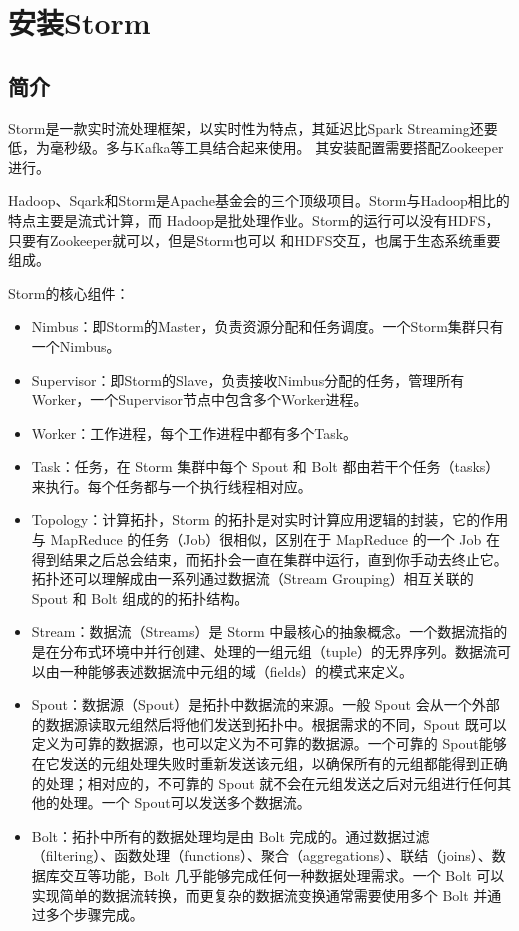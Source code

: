 \section{安装Storm}
\subsection{简介}
Storm是一款实时流处理框架，以实时性为特点，其延迟比Spark Streaming还要低，为毫秒级。多与Kafka等工具结合起来使用。
其安装配置需要搭配Zookeeper进行。

Hadoop、Sqark和Storm是Apache基金会的三个顶级项目。Storm与Hadoop相比的特点主要是流式计算，而
Hadoop是批处理作业。Storm的运行可以没有HDFS，只要有Zookeeper就可以，但是Storm也可以
和HDFS交互，也属于生态系统重要组成。

Storm的核心组件：

\begin{itemize}
	\item Nimbus：即Storm的Master，负责资源分配和任务调度。一个Storm集群只有一个Nimbus。
	\item Supervisor：即Storm的Slave，负责接收Nimbus分配的任务，管理所有Worker，一个Supervisor节点中包含多个Worker进程。
	\item Worker：工作进程，每个工作进程中都有多个Task。
	\item Task：任务，在 Storm 集群中每个 Spout 和 Bolt 都由若干个任务（tasks）来执行。每个任务都与一个执行线程相对应。
	\item Topology：计算拓扑，Storm 的拓扑是对实时计算应用逻辑的封装，它的作用与 MapReduce 的任务（Job）很相似，区别在于 MapReduce 的一个 Job 在得到结果之后总会结束，而拓扑会一直在集群中运行，直到你手动去终止它。拓扑还可以理解成由一系列通过数据流（Stream Grouping）相互关联的 Spout 和 Bolt 组成的的拓扑结构。
	\item Stream：数据流（Streams）是 Storm 中最核心的抽象概念。一个数据流指的是在分布式环境中并行创建、处理的一组元组（tuple）的无界序列。数据流可以由一种能够表述数据流中元组的域（fields）的模式来定义。
	\item Spout：数据源（Spout）是拓扑中数据流的来源。一般 Spout 会从一个外部的数据源读取元组然后将他们发送到拓扑中。根据需求的不同，Spout 既可以定义为可靠的数据源，也可以定义为不可靠的数据源。一个可靠的 Spout能够在它发送的元组处理失败时重新发送该元组，以确保所有的元组都能得到正确的处理；相对应的，不可靠的 Spout 就不会在元组发送之后对元组进行任何其他的处理。一个 Spout可以发送多个数据流。
	\item Bolt：拓扑中所有的数据处理均是由 Bolt 完成的。通过数据过滤（filtering）、函数处理（functions）、聚合（aggregations）、联结（joins）、数据库交互等功能，Bolt 几乎能够完成任何一种数据处理需求。一个 Bolt 可以实现简单的数据流转换，而更复杂的数据流变换通常需要使用多个 Bolt 并通过多个步骤完成。

\end{itemize}
